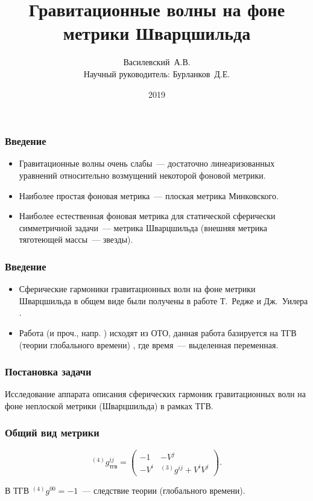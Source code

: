 \documentclass[compress]{beamer}
\title{Гравитационные волны на фоне метрики Шварцшильда}
\author[Василевский~А.В.]{
    Василевский~А.В. \\[\baselineskip]
    {\footnotesize Научный руководитель: Бурланков~Д.Е.}
}
\institute[ННГУ]{Нижегородский университет им. Н.И.~Лобачевского}
\date{2019}
\begin{document}
    \frame[plain]{\titlepage}

    \begin{frame}\frametitle{Введение}

        \begin{itemize}
            \item Гравитационные волны очень слабы~--- достаточно линеаризованных уравнений относительно возмущений некоторой фоновой метрики.
            \item Наиболее простая фоновая метрика~--- плоская метрика Минковского.
            \item Наиболее естественная фоновая метрика для статической сферически симметричной задачи~--- метрика Шварцшильда (внешняя метрика тяготеющей массы~--- звезды).
        \end{itemize}

    \end{frame}

    \begin{frame}\frametitle{Введение}

        \begin{itemize}
            \item Сферические гармоники гравитационных волн на фоне метрики Шварцшильда в общем виде были получены в работе Т.~Редже и Дж.~Уилера \cite{regge_wheeler_1957}.
            \item Работа \cite{regge_wheeler_1957} (и проч., напр. \cite{thorne_multipole}) исходят из ОТО, данная работа базируется на ТГВ (теории глобального времени) \cite{burlankov_space_dynamics}, где время~--- выделенная переменная.
        \end{itemize}

    \end{frame}

    \begin{frame}\frametitle{Постановка задачи}

        Исследование аппарата описания сферических гармоник гравитационных волн на фоне неплоской метрики (Шварцшильда) в рамках ТГВ.

    \end{frame}

    \begin{frame}\frametitle{Общий вид метрики}

        \begin{equation*}
            {}^{(4)}g^{ij}_\text{тгв} = \begin{pmatrix}
                - 1   & - V^j                           \\
                - V^i & {}^{(3)}g^{ij} + V^i V^j
            \end{pmatrix} .
        \end{equation*}

        В ТГВ ${}^{(4)}g^{00} = -1$~--- следствие теории (глобального времени).

    \end{frame}
\end{document}
